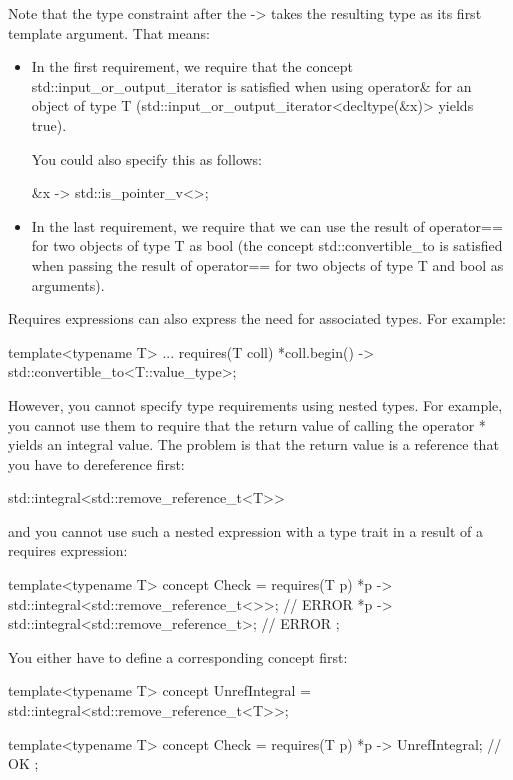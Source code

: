 Note that the type constraint after the -> takes the resulting type as its first template argument. That means:

\begin{itemize}
\item
In the first requirement, we require that the concept std::input\_or\_output\_iterator is satisfied when using operator\& for an object of type T (std::input\_or\_output\_iterator<decltype(\&x)> yields true).

You could also specify this as follows:

\begin{cpp}
{ &x } -> std::is_pointer_v<>;
\end{cpp}

\item
In the last requirement, we require that we can use the result of operator== for two objects of type T as bool (the concept std::convertible\_to is satisfied when passing the result of operator== for two objects of type T and bool as arguments).
\end{itemize}

Requires expressions can also express the need for associated types. For example:

\begin{cpp}
template<typename T>
... requires(T coll) {
	{ *coll.begin() } -> std::convertible_to<T::value_type>;
}
\end{cpp}

However, you cannot specify type requirements using nested types. For example, you cannot use them to require that the return value of calling the operator * yields an integral value. The problem is that the return value is a reference that you have to dereference first:

\begin{cpp}
std::integral<std::remove_reference_t<T>>
\end{cpp}

and you cannot use such a nested expression with a type trait in a result of a requires expression:

\begin{cpp}
template<typename T>
concept Check = requires(T p) {
	{ *p } -> std::integral<std::remove_reference_t<>>; // ERROR
	{ *p } -> std::integral<std::remove_reference_t>; // ERROR
};
\end{cpp}

You either have to define a corresponding concept first:

\begin{cpp}
template<typename T>
concept UnrefIntegral = std::integral<std::remove_reference_t<T>>;

template<typename T>
concept Check = requires(T p) {
	{ *p } -> UnrefIntegral; // OK
};
\end{cpp}


